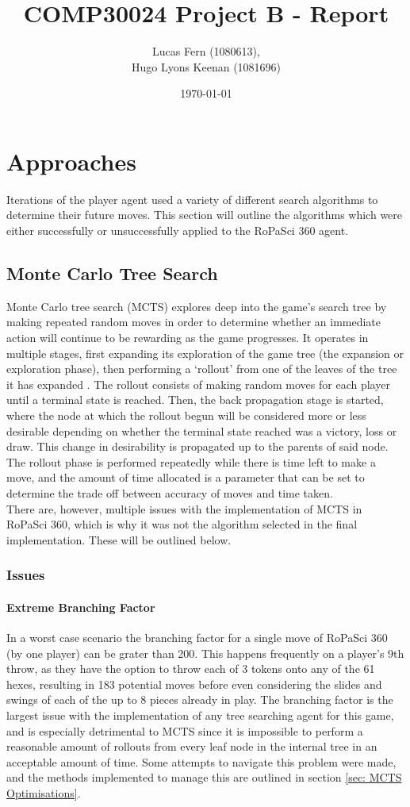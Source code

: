 \documentclass{article}
\title{COMP30024 Project B - Report}
\date{\today}
\author{Lucas Fern (1080613),\\Hugo Lyons Keenan (1081696)}
\begin{document}
\maketitle
\tableofcontents
\section{Approaches}
Iterations of the player agent used a variety of different search algorithms to determine their future moves. This section will outline the algorithms which were either successfully or unsuccessfully applied to the RoPaSci 360 agent.
\subsection{Monte Carlo Tree Search}
Monte Carlo tree search (MCTS) explores deep into the game's search tree by making repeated random moves in order to determine whether an immediate action will continue to be rewarding as the game progresses. It operates in multiple stages, first expanding its exploration of the game tree (the expansion or exploration phase), then performing a `rollout' from one of the leaves of the tree it has expanded \cite{YT-MCTS}. The rollout consists of making random moves for each player until a terminal state is reached. Then, the back propagation stage is started, where the node at which the rollout begun will be considered more or less desirable depending on whether the terminal state reached was a victory, loss or draw. This change in desirability is propagated up to the parents of said node. The rollout phase is performed repeatedly while there is time left to make a move, and the amount of time allocated is a parameter that can be set to determine the trade off between accuracy of moves and time taken.\\[2mm]
There are, however, multiple issues with the implementation of MCTS in RoPaSci 360, which is why it was not the algorithm selected in the final implementation. These will be outlined below.
\subsubsection{Issues}
\paragraph{Extreme Branching Factor}
In a worst case scenario the branching factor for a single move of RoPaSci 360 (by one player) can be grater than 200. This happens frequently on a player's 9th throw, as they have the option to throw each of 3 tokens onto any of the 61 hexes, resulting in 183 potential moves before even considering the slides and swings of each of the up to 8 pieces already in play. The branching factor is the largest issue with the implementation of any tree searching agent for this game, and is especially detrimental to MCTS since it is impossible to perform a reasonable amount of rollouts from every leaf node in the internal tree in an acceptable amount of time. Some attempts to navigate this problem were made, and the methods implemented to manage this are outlined in section \ref{sec: MCTS Optimisations}.
\end{document}
